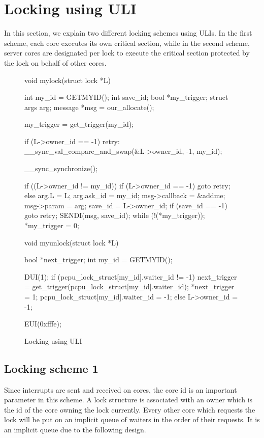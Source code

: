\section{Locking using ULI}\label{sec:lock}

In this section, we explain two different locking schemes using ULIs. In the
first scheme, each core executes its own critical section, while in the second
scheme, server cores are designated per lock to execute the critical section
protected by the lock on behalf of other cores.

\begin{figure}
\begin{code} 
void mylock(struct lock *L)
{
    int my_id  = GETMYID();
    int save_id;
    bool *my_trigger;
    struct args arg;
    message *msg = our_allocate();

    my_trigger = get_trigger(my_id);

    if (L->owner_id == -1)
retry:
        __sync_val_compare_and_swap(&L->owner_id, -1, my_id);

    __sync_synchronize();

    if ((L->owner_id != my_id)) {
        if (L->owner_id == -1) {
            goto retry;
        } else {
            arg.L = L;
            arg.ask_id = my_id;
            msg->callback = &addme;
            msg->param = arg;
            save_id = L->owner_id;
            if (save_id == -1)
                goto retry;
            SENDI(msg, save_id);
            while (!(*my_trigger));
        }
    }
    *my_trigger = 0;
}

void myunlock(struct lock *L)
{
    bool *next_trigger;
    int my_id = GETMYID();

    DUI(1);
    if (pcpu_lock_struct[my_id].waiter_id != -1) {
        next_trigger = get_trigger(pcpu_lock_struct[my_id].waiter_id);
        *next_trigger = 1;
        pcpu_lock_struct[my_id].waiter_id = -1;
    } else {
        L->owner_id = -1;
    }

    EUI(0xfffe);
}
\end{code}
\caption{Locking using ULI\label{fig-locking}}
\end{figure}

\subsection{Locking scheme 1}

Since interrupts are sent and received on cores, the core id is an important
parameter in this scheme. A lock structure is associated with an owner which is
the id of the core owning the lock currently. Every other core which requests
the lock will be put on an implicit queue of waiters in the order of their
requests. It is an implicit queue due to the following design.

